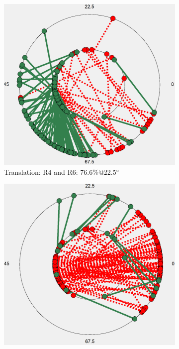 \documentclass[a4paper]{article}
\begin{document}
\begin{figure}
    \vspace{0.2cm} %
    \begin{subfigure}[b]{0.45\textwidth}
        \includegraphics[width=\linewidth]{stable_BA_run_only.png}
        \caption{Translation: R4 and R6: 76.6\%@22.5°}
        \label{fig:stable_BA_run_only}
    \end{subfigure}
    \hspace{0.03\textwidth} %
    \begin{subfigure}[b]{0.45\textwidth}
        \includegraphics[width=\linewidth]{stable_BA_run_quest.png}

\end{subfigure}
\end{figure}
\end{document}
